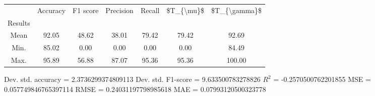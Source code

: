 \begin{tabular}{|c|c|c|c|c|c|c|}
\toprule
{} &  Accuracy &  F1 score &  Precision &  Recall &  \$T\_\{\textbackslash mu\}\$ &  \$T\_\{\textbackslash gamma\}\$ \\
Results &           &           &            &         &            &               \\
\hline
Mean    &     92.05 &     48.62 &      38.01 &   79.42 &      79.42 &         92.69 \\
Min.    &     85.02 &      0.00 &       0.00 &    0.00 &       0.00 &         84.49 \\
Max.    &     95.89 &     56.88 &      87.07 &   95.36 &      95.36 &        100.00 \\
\bottomrule
\end{tabular}

 Dev. std. accuracy = 2.3736299374809113
 Dev. std. F1-score = 9.633500783278826
 $R^2$ = -0.2570500762201855
 MSE = 0.057749846765397114
 RMSE = 0.24031197798985618
 MAE = 0.07993120500323778